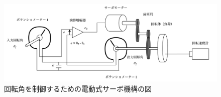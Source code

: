\begin{figure}
    \centering
    \includegraphics[width=\linewidth]{src/figures/electric-servo-mechanism/electric-servo-mechanism.png}
    \caption{回転角を制御するための電動式サーボ機構の図}\label{fig:electric-servo-mechanism}
\end{figure}
